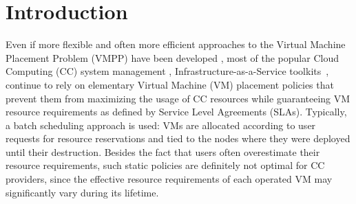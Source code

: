 \section{Introduction}
\label{sec:intro}


Even if more flexible and often more efficient approaches to the
Virtual Machine Placement Problem (VMPP) have been developed
, most of the popular Cloud Computing (CC) system
management \cite{cloudstack, opennebula, openstack}, \aka
Infrastructure-as-a-Service toolkits~\cite{moreno:2012}, continue to
rely on elementary Virtual Machine (VM) placement policies that
prevent them from maximizing the usage of CC resources while
guaranteeing VM resource requirements as defined by Service Level
Agreements (SLAs).
Typically, a batch scheduling approach is used: VMs are allocated
according to user requests for resource reservations and tied to
the nodes where they were deployed until their destruction. Besides
the fact that users often overestimate their resource requirements,
such static policies are definitely not optimal for CC providers,
since the effective resource requirements of each operated VM may
significantly vary during its lifetime.

